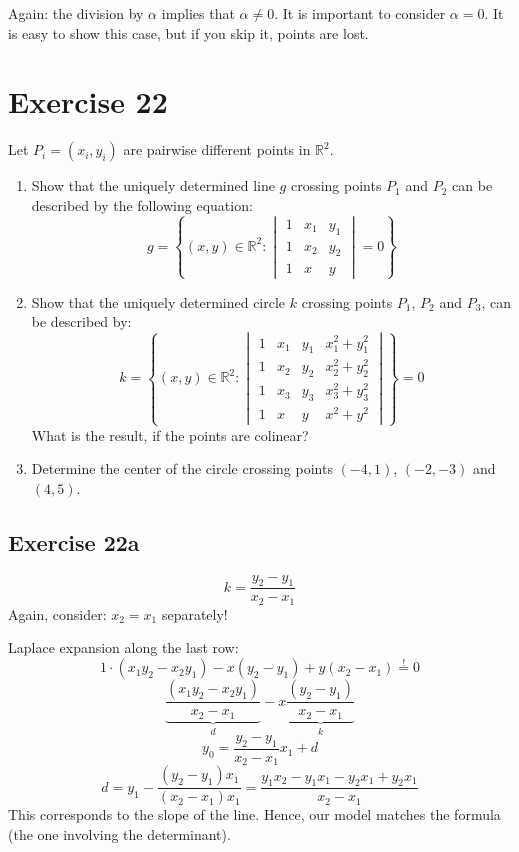 \documentclass[a4paper]{article}
\theoremstyle{definition}
\newcommand\set[1]{\left\{#1\right\}}
\begin{document}
Again: the division by $\alpha$ implies that $\alpha \neq 0$. It is important to consider $\alpha = 0$. It is easy to show this case, but if you skip it, points are lost.

\section*{Exercise 22}
\begin{ex}
  Let $P_i = (x_i, y_i)$ are pairwise different points in $\mathbb R^2$.
  \begin{enumerate}
    \item Show that the uniquely determined line $g$ crossing points $P_1$ and $P_2$ can be described by the following equation:
      \[ g = \set{(x,y) \in \mathbb R^2: \begin{vmatrix} 1 & x_1 & y_1 \\ 1 & x_2 & y_2 \\ 1 & x & y \end{vmatrix} = 0} \]
    \item Show that the uniquely determined circle $k$ crossing points $P_1$, $P_2$ and $P_3$,
      can be described by:
      \[
        k = \set{
          (x,y) \in \mathbb R^2:
          \begin{vmatrix}
            1 & x_1 & y_1 & x_1^2 + y_1^2 \\
            1 & x_2 & y_2 & x_2^2 + y_2^2 \\
            1 & x_3 & y_3 & x_3^2 + y_3^2 \\
            1 & x & y & x^2 + y^2
          \end{vmatrix}
        } = 0
      \]
      What is the result, if the points are colinear?
    \item Determine the center of the circle crossing points $(-4, 1)$, $(-2, -3)$ and $(4,5)$.
  \end{enumerate}
\end{ex}

\subsection{Exercise 22a}
\[ k =\frac{y_2 - y_1}{x_2 - x_1} \]
Again, consider: $x_2 = x_1$ separately!

Laplace expansion along the last row:
\[ 1 \cdot (x_1 y_2 - x_2 y_1) - x(y_2 - y_1) + y(x_2 - x_1) \overset!= 0 \]
\[
  \underbrace{\frac{(x_1 y_2 - x_2 y_1)}{x_2 - x_1}}_{d}
  - x \underbrace{\frac{(y_2 - y_1)}{x_2 - x_1}}_{k}
\] \[
  y_0 = \frac{y_2 - y_1}{x_2 - x_1} x_1 + d
\] \[
  d = y_1 - \frac{(y_2 - y_1) x_1}{(x_2 - x_1) x_1}
  = \frac{y_1 x_2 - y_1 x_1 - y_2 x_1 + y_2 x_1}{x_2 - x_1}
\]
This corresponds to the slope of the line. Hence, our model matches the formula (the one involving the determinant).
\end{document}

